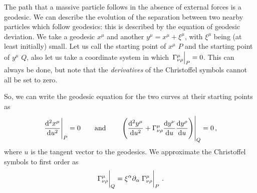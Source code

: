 \documentclass[main.tex]{subfiles}
\begin{document}
The path that a massive particle follows in the absence of external forces is a geodesic. 
We can describe the evolution of the separation between two nearby particles which follow geodesics: this is described by the equation of geodesic deviation. 
We take a geodesic \(x^{\mu }\) and another \(y^{\mu } = x^{\mu }+ \xi^{\mu }\), with \(\xi^{\mu }\) being (at least initially) small. 
Let us call the starting point of \(x^{\mu }\) \(P\) and the starting point of \(y^{\mu }\) \(Q\),
also let us take a coordinate system in which \(\eval{\Gamma^{\mu }_{\nu \rho }}_{P} =0\). This can always be done, but note that the \emph{derivatives} of the Christoffel symbols cannot all be set to zero. 

So, we can write the geodesic equation for the two curves at their starting points as 
%
\begin{align}
\eval{\dv[2]{x^{\mu }}{u}}_{P} = 0
\qquad \text{and} \qquad
\eval{\qty(\dv[2]{y^{\mu }}{u} + \Gamma^{\mu }_{\nu \rho } \dv{y^{\nu }}{u} \dv{y^{\rho }}{u})}_{Q} = 0
\,,
\end{align}
%
where \(u\) is the tangent vector to the geodesics.
We approximate the Christoffel symbols to first order as 
%
\begin{align}
\eval{\Gamma^{\mu }_{\nu \rho }}_{Q} = \xi^{\alpha } \partial_{\alpha } \eval{\Gamma^{\mu }_{\nu \rho }}_{P}
\,.
\end{align}
\end{document}
